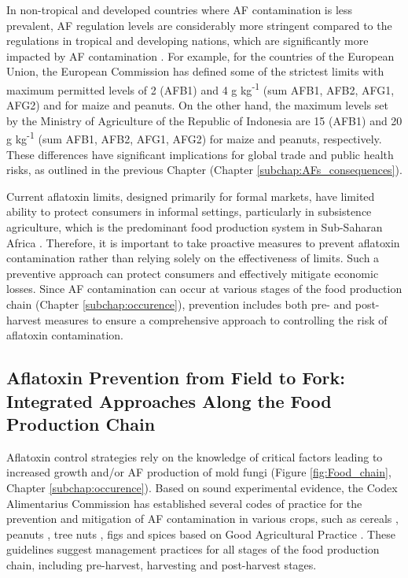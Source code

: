 

In non-tropical and developed countries where AF contamination is less prevalent, AF regulation levels are considerably more stringent compared to the regulations in tropical and developing nations, which are significantly more impacted by AF contamination \citep{sirma2018impacts}. For example, for the countries of the European Union, the European Commission has defined some of the strictest limits with maximum permitted levels of 2 (AFB1) and 4 \textmu{}g kg\textsuperscript{-1} (sum AFB1, AFB2, AFG1, AFG2) and for maize and peanuts. On the other hand, the maximum levels set by the Ministry of Agriculture of the Republic of Indonesia are 15 (AFB1) and 20 \textmu{}g kg\textsuperscript{-1} (sum AFB1, AFB2, AFG1, AFG2) for maize and peanuts, respectively. These differences have significant implications for global trade and public health risks, as outlined in the previous Chapter (Chapter \ref{subchap:AFs_consequences}). 


Current aflatoxin limits, designed primarily for formal markets, have limited ability to protect consumers in informal settings, particularly in subsistence agriculture, which is the predominant food production system in Sub-Saharan Africa \citep{nji2022aflatoxins}. Therefore, it is important to take proactive measures to prevent aflatoxin contamination rather than relying solely on the effectiveness of limits. Such a preventive approach can protect consumers and effectively mitigate economic losses. Since AF contamination can occur at various stages of the food production chain (Chapter \ref{subchap:occurence}), prevention includes both pre- and post-harvest measures to ensure a comprehensive approach to controlling the risk of aflatoxin contamination.


\subsection{Aflatoxin Prevention from Field to Fork: Integrated Approaches Along the Food Production Chain} \label{subchap:prevention}

Aflatoxin control strategies rely on the knowledge of critical factors leading to increased growth and/or AF production of mold fungi (Figure \ref{fig:Food_chain}, Chapter \ref{subchap:occurence}). Based on sound experimental evidence, the Codex Alimentarius Commission has established several codes of practice for the prevention and mitigation of AF contamination in various crops, such as cereals \citep{CAC2003}, peanuts \citep{CAC2004}, tree nuts \citep{CAC2010}, figs \citep{CAC2008} and spices \citep{CAC2017} based on Good Agricultural Practice \citep{fao2003development}. These guidelines suggest management practices for all stages of the food production chain, including pre-harvest, harvesting and post-harvest stages.


